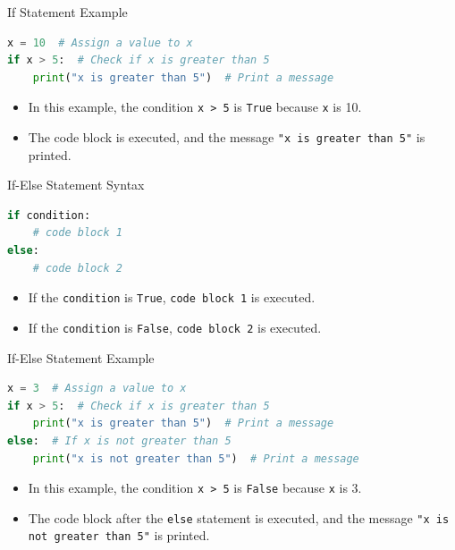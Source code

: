 \documentclass{beamer}
\begin{document}
\begin{frame}[fragile]{If Statement Example}
    \begin{lstlisting}[style=colorful, language=Python]
x = 10  # Assign a value to x
if x > 5:  # Check if x is greater than 5
    print("x is greater than 5")  # Print a message
    \end{lstlisting}
    \begin{itemize}
        \item In this example, the condition \texttt{x > 5} is \texttt{True} because \texttt{x} is 10.
        \item The code block is executed, and the message \texttt{"x is greater than 5"} is printed.
    \end{itemize}
\end{frame}

\begin{frame}[fragile]{If-Else Statement Syntax}
    \begin{lstlisting}[style=colorful, language=Python]
if condition:
    # code block 1
else:  
    # code block 2
    \end{lstlisting}
    \begin{itemize}
        \item If the \texttt{condition} is \texttt{True}, \texttt{code block 1} is executed.
        \item If the \texttt{condition} is \texttt{False}, \texttt{code block 2} is executed.
    \end{itemize}
\end{frame}     


\begin{frame}[fragile]{If-Else Statement Example}
    \begin{lstlisting}[style=colorful, language=Python]
x = 3  # Assign a value to x
if x > 5:  # Check if x is greater than 5
    print("x is greater than 5")  # Print a message
else:  # If x is not greater than 5
    print("x is not greater than 5")  # Print a message
    \end{lstlisting}
    \begin{itemize}
        \item In this example, the condition \texttt{x > 5} is \texttt{False} because \texttt{x} is 3.
        \item The code block after the \texttt{else} statement is executed, and the message \texttt{"x is not greater than 5"} is printed.
    \end{itemize}
\end{frame}
\end{document}
